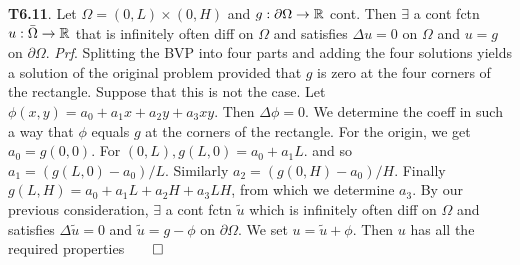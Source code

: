 {\bf T6.11}. Let $\Omega=(0,L) \times (0,H)$ and $g: \partial \Omega \rightarrow \mathbb{R}$ cont.  Then $\exists$ a cont fctn $u: \bar{\Omega} \rightarrow \mathbb{R}$ that is infinitely often diff on $\Omega$ and satisfies $\Delta u = 0$ on $\Omega$ and $u=g$ on $\partial \Omega$. {\it Prf}. Splitting the BVP into four parts and adding the four solutions yields a solution of the original problem provided that $g$ is zero at the four corners of the rectangle. Suppose that this is not the case.  Let $\phi(x,y) = a_0 + a_1 x + a_2 y + a_3 xy$. Then $\Delta \phi = 0$. We determine the coeff in such a way that $\phi$ equals $g$ at the corners of the rectangle.  For the origin, we get $a_0 = g(0,0)$. For $(0,L), g(L,0) = a_0 + a_1L$. and so $a_1 = (g(L,0)-a_0)/L$. Similarly $a_2 = (g(0,H)-a_0)/H$. Finally $g(L, H)=a_0+a_1 L + a_2 H + a_3 L H$, from which we determine $a_3$. By our previous consideration, $\exists$ a cont fctn $\tilde{u}$ which is infinitely often diff on $\Omega$ and satisfies $\Delta \tilde{u} = 0$ and $\tilde{u} = g - \phi$ on $\partial \Omega$. We set $u = \tilde{u} + \phi$. Then $u$ has all the required properties$\qed$